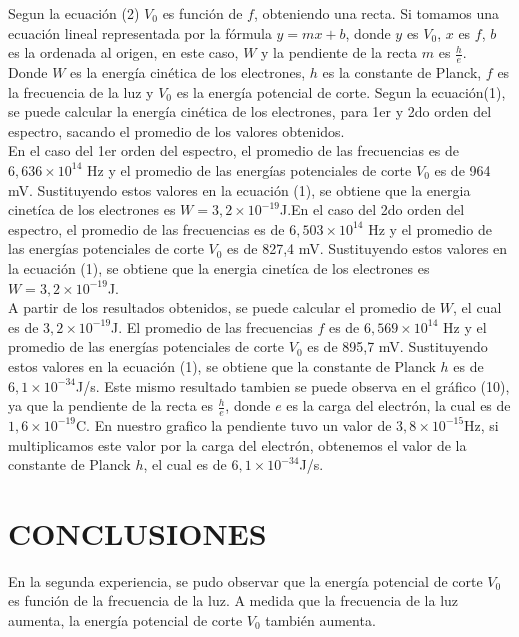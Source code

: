\documentclass[a4paper]{article}
\begin{document}
      \vspace{5mm}

      \indent Segun la ecuación (2) $V_{0}$ es función de $f$, obteniendo una recta. Si tomamos una ecuación lineal representada por la fórmula $y = mx + b$, donde $y$ es $V_{0}$, $x$ es $f$, $b$ es la ordenada al origen, en este caso, $W$ y  la pendiente de la recta $m$ es $\frac{h}{e}$.\\
      \indent Donde $W$ es la energía cinética de los electrones, $h$ es la constante de Planck, $f$ es la frecuencia de la luz y $V_{0}$ es la energía potencial de corte. Segun la ecuación(1), se puede calcular la energía cinética de los electrones, para 1er y 2do orden del espectro, sacando el promedio de los valores obtenidos.\\
      \indent En el caso del 1er orden del espectro, el promedio de las frecuencias es de $6,636 \times 10^{14}$ Hz y el promedio de las energías potenciales de corte $V_{0}$ es de 964 mV. Sustituyendo estos valores en la ecuación (1), se obtiene que la energia cinetíca de los electrones es $W = 3,2 \times 10^{-19}$J.En el caso del 2do orden del espectro, el promedio de las frecuencias es de $6,503 \times 10^{14}$ Hz y el promedio de las energías potenciales de corte $V_{0}$ es de 827,4 mV. Sustituyendo estos valores en la ecuación (1), se obtiene que la energia cinetíca de los electrones es $W = 3,2 \times 10^{-19}$J.\\
      \indent A partir de los resultados obtenidos, se puede calcular el promedio de $W$, el cual es de $3,2 \times 10^{-19}$J. El promedio de las frecuencias $f$ es de $6,569 \times 10^{14}$ Hz y el promedio de las energías potenciales de corte $V_{0}$ es de 895,7 mV. Sustituyendo estos valores en la ecuación (1), se obtiene que la constante de Planck $h$ es de $6,1 \times 10^{-34}$J/s. Este mismo resultado tambien se puede observa en el gráfico (10), ya que la pendiente de la recta es $\frac{h}{e}$, donde $e$ es la carga del electrón, la cual es de $1,6 \times 10^{-19}$C. En nuestro grafico la pendiente tuvo un valor de $3,8 \times 10^{-15}$Hz, si multiplicamos este valor por la carga del electrón, obtenemos el valor de la constante de Planck $h$, el cual es de $6,1 \times 10^{-34}$J/s.\\
      
    \section{CONCLUSIONES}
    \indent En la segunda experiencia, se pudo observar que la energía potencial de corte $V_{0}$ es función de la frecuencia de la luz. A medida que la frecuencia de la luz aumenta, la energía potencial de corte $V_{0}$ también aumenta. 
    
\end{document}
